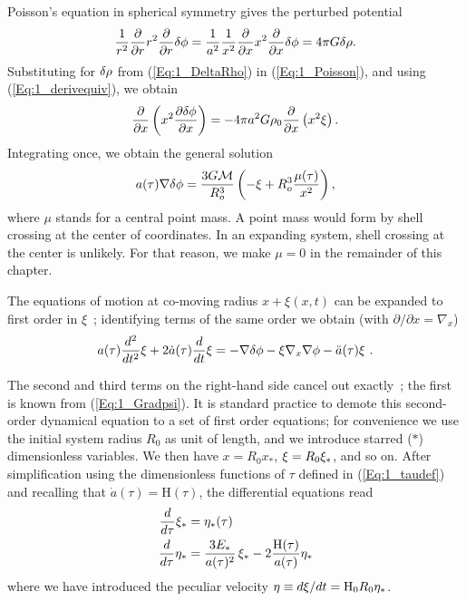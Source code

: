 Poisson's equation in spherical symmetry gives the perturbed potential 
\begin{equation} 
\label{Eq:1_Poisson} 
\frac{1}{r^2}\frac{\partial}{\partial r} r^2\frac{\partial}{\partial r} \delta\phi =\frac{1}{a^2}\frac{1}{x^2}\frac{\partial}{\partial x} x^2\frac{\partial}{\partial x} \delta\phi  = 4\pi G\delta\rho .
\end{equation}
Substituting for $\delta\rho$ from (\ref{Eq:1_DeltaRho}) in (\ref{Eq:1_Poisson}), and using (\ref{Eq:1_derivequiv}), we obtain
\begin{equation}
\frac{\partial}{\partial x} \left( x^2 \frac{\partial \delta\phi}{\partial x} \right) = - 4\pi a^2 G \rho_0 \frac{\partial}{\partial x} \left( x^2 \xi \right).
\end{equation}
Integrating once, we obtain the general solution
\begin{equation}
\label{Eq:1_Gradpsi} 
a(\tau)\nabla \delta\phi = \frac{3G{\cal M}}{R_o^3} \left( - \xi + R_o^3\frac{\mu(\tau)}{x^2} \right),
\end{equation}
where $\mu$ stands for a central point mass. A point mass would form by shell crossing at the center of coordinates. In an expanding system, shell crossing at the center is unlikely. For that reason, we make $ \mu = 0$ in the remainder of this chapter.

The equations of motion at co-moving radius $x +\xi(x,t)$ can be expanded to first order in $\xi$~; identifying terms of the same order we obtain (with $\partial/\partial x = \nabla_x$)
\begin{equation} 
a(\tau) \frac{d^2}{d t^2} \xi + 2 \dot{a}(\tau) \frac{d}{dt}\xi = - \nabla\delta\phi - \xi \nabla_x \nabla\phi - \ddot{a}(\tau)\xi \ . 
\end{equation} 

The second and third terms on the right-hand side cancel out exactly~; the first is known from (\ref{Eq:1_Gradpsi}). It is standard practice to demote this second-order dynamical equation to a set of first order equations; for convenience we use the initial system radius $R_0$ as unit of length,  and we introduce starred ($\ast$) dimensionless variables. We then have $x = R_0 x_\ast$,  $\xi = R_0\xi_\ast$, and so on.  After simplification using the dimensionless functions of $\tau$  defined in (\ref{Eq:1_taudef}) and recalling that $\dot{a}(\tau) = \textrm{H}(\tau)$, the differential equations read
\begin{subequations}
 \label{Eq:1_system}
    \begin{align}
    	\label{Eq:1_systema}
		\frac{d}{d\tau} \xi_\ast &=  \eta_\ast(\tau)  \\ 
		\label{Eq:1_systemb}
		\frac{d}{d\tau} \eta_\ast &= \frac{3 E_\ast}{a(\tau)^2}\,\xi_\ast - 2 		\frac{\textrm{H}(\tau)}{a(\tau)} \eta_\ast   
	\end{align}
\end{subequations}
where we have introduced the peculiar velocity $\eta \equiv d\xi/dt = {\textrm{H}}_0R_0 \eta_\ast$.  



